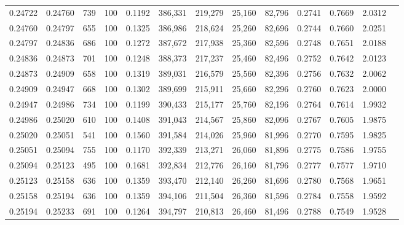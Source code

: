 \begin{tabular}{rrrrrrrrrrrrr}
0.24722 & 0.24760 &   739 & 100 &                                     0.1192 & 386,331 & 219,279 &  25,160 &  82,796 & 0.2741 & 0.7669 & 2.0312 \\
0.24760 & 0.24797 &   655 & 100 &                                     0.1325 & 386,986 & 218,624 &  25,260 &  82,696 & 0.2744 & 0.7660 & 2.0251 \\
0.24797 & 0.24836 &   686 & 100 &                                     0.1272 & 387,672 & 217,938 &  25,360 &  82,596 & 0.2748 & 0.7651 & 2.0188 \\
0.24836 & 0.24873 &   701 & 100 &                                     0.1248 & 388,373 & 217,237 &  25,460 &  82,496 & 0.2752 & 0.7642 & 2.0123 \\
0.24873 & 0.24909 &   658 & 100 &                                     0.1319 & 389,031 & 216,579 &  25,560 &  82,396 & 0.2756 & 0.7632 & 2.0062 \\
0.24909 & 0.24947 &   668 & 100 &                                     0.1302 & 389,699 & 215,911 &  25,660 &  82,296 & 0.2760 & 0.7623 & 2.0000 \\
0.24947 & 0.24986 &   734 & 100 &                                     0.1199 & 390,433 & 215,177 &  25,760 &  82,196 & 0.2764 & 0.7614 & 1.9932 \\
0.24986 & 0.25020 &   610 & 100 &                                     0.1408 & 391,043 & 214,567 &  25,860 &  82,096 & 0.2767 & 0.7605 & 1.9875 \\
0.25020 & 0.25051 &   541 & 100 &                                     0.1560 & 391,584 & 214,026 &  25,960 &  81,996 & 0.2770 & 0.7595 & 1.9825 \\
0.25051 & 0.25094 &   755 & 100 &                                     0.1170 & 392,339 & 213,271 &  26,060 &  81,896 & 0.2775 & 0.7586 & 1.9755 \\
0.25094 & 0.25123 &   495 & 100 &                                     0.1681 & 392,834 & 212,776 &  26,160 &  81,796 & 0.2777 & 0.7577 & 1.9710 \\
0.25123 & 0.25158 &   636 & 100 &                                     0.1359 & 393,470 & 212,140 &  26,260 &  81,696 & 0.2780 & 0.7568 & 1.9651 \\
0.25158 & 0.25194 &   636 & 100 &                                     0.1359 & 394,106 & 211,504 &  26,360 &  81,596 & 0.2784 & 0.7558 & 1.9592 \\
0.25194 & 0.25233 &   691 & 100 &                                     0.1264 & 394,797 & 210,813 &  26,460 &  81,496 & 0.2788 & 0.7549 & 1.9528 \\

\end{tabular}
